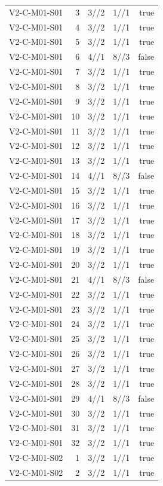 {\begin{longtable}{lrrrr}
V2-C-M01-S01 & 3 & 3//2 & 1//1 & true \\
V2-C-M01-S01 & 4 & 3//2 & 1//1 & true \\
V2-C-M01-S01 & 5 & 3//2 & 1//1 & true \\
V2-C-M01-S01 & 6 & 4//1 & 8//3 & false \\
V2-C-M01-S01 & 7 & 3//2 & 1//1 & true \\
V2-C-M01-S01 & 8 & 3//2 & 1//1 & true \\
V2-C-M01-S01 & 9 & 3//2 & 1//1 & true \\
V2-C-M01-S01 & 10 & 3//2 & 1//1 & true \\
V2-C-M01-S01 & 11 & 3//2 & 1//1 & true \\
V2-C-M01-S01 & 12 & 3//2 & 1//1 & true \\
V2-C-M01-S01 & 13 & 3//2 & 1//1 & true \\
V2-C-M01-S01 & 14 & 4//1 & 8//3 & false \\
V2-C-M01-S01 & 15 & 3//2 & 1//1 & true \\
V2-C-M01-S01 & 16 & 3//2 & 1//1 & true \\
V2-C-M01-S01 & 17 & 3//2 & 1//1 & true \\
V2-C-M01-S01 & 18 & 3//2 & 1//1 & true \\
V2-C-M01-S01 & 19 & 3//2 & 1//1 & true \\
V2-C-M01-S01 & 20 & 3//2 & 1//1 & true \\
V2-C-M01-S01 & 21 & 4//1 & 8//3 & false \\
V2-C-M01-S01 & 22 & 3//2 & 1//1 & true \\
V2-C-M01-S01 & 23 & 3//2 & 1//1 & true \\
V2-C-M01-S01 & 24 & 3//2 & 1//1 & true \\
V2-C-M01-S01 & 25 & 3//2 & 1//1 & true \\
V2-C-M01-S01 & 26 & 3//2 & 1//1 & true \\
V2-C-M01-S01 & 27 & 3//2 & 1//1 & true \\
V2-C-M01-S01 & 28 & 3//2 & 1//1 & true \\
V2-C-M01-S01 & 29 & 4//1 & 8//3 & false \\
V2-C-M01-S01 & 30 & 3//2 & 1//1 & true \\
V2-C-M01-S01 & 31 & 3//2 & 1//1 & true \\
V2-C-M01-S01 & 32 & 3//2 & 1//1 & true \\
V2-C-M01-S02 & 1 & 3//2 & 1//1 & true \\
V2-C-M01-S02 & 2 & 3//2 & 1//1 & true \\

\end{longtable}}
